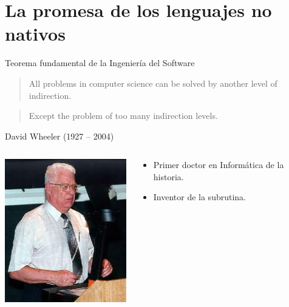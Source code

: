 \section{La promesa de los lenguajes no nativos}

\begin{frame}[t]{Teorema fundamental de la Ingeniería del Software}
  \begin{quote}
    All problems in computer science can be solved by another level of indirection.
  \end{quote}
  \pause
  \begin{quote}
    Except the problem of too many indirection levels.
  \end{quote}
  \hfill David Wheeler (1927 -- 2004)
  \vfill
  \pause
  \begin{columns}[t]
    \begin{column}[T]{0.3\textwidth}
      \includegraphics[width=.9\textwidth]{images/wheeler.jpg}
    \end{column}
    \begin{column}[T]{0.7\textwidth}
      \begin{itemize}
        \item Primer doctor en Informática de la historia.
        \item Inventor de la subrutina.
      \end{itemize}
    \end{column}
  \end{columns}
\end{frame}

